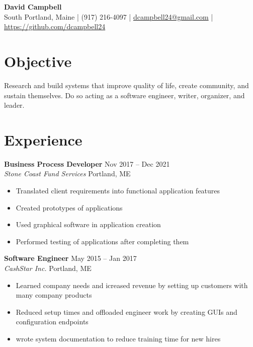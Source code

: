 \documentclass[letterpaper,10pt]{article}
\begin{document}
\begin{center}
    {\huge \textbf{David Campbell}} \\[4pt]
    South Portland, Maine | (917) 216-4097 |
    \href{mailto:dcampbell24@gmail.com}{dcampbell24@gmail.com} |
    \href{https://github.com/dcampbell24}{https://github.com/dcampbell24}
\end{center}

\section{Objective}

Research and build systems that improve quality of life, create community, and sustain themselves.
Do so acting as a software engineer, writer, organizer, and leader.

\section{Experience}
\noindent\textbf{Business Process Developer} \hfill Nov 2017 -- Dec 2021 \\
\textit{Stone Coast Fund Services} \hfill Portland, ME
\begin{itemize}
    \item Translated client requirements into functional application features
    \item Created prototypes of applications
    \item Used graphical software in application creation
    \item Performed testing of applications after completing them
\end{itemize}

\vspace{6pt}
\noindent\textbf{Software Engineer} \hfill May 2015 -- Jan 2017 \\
\textit{CashStar Inc.} \hfill Portland, ME
\begin{itemize}
    \item Learned company needs and icreased revenue by setting up customers with many company products
    \item Reduced setup times and offloaded engineer work by creating GUIs and configuration endpoints
    \item wrote system documentation to reduce training time for new hires
\end{itemize}
\end{document}
